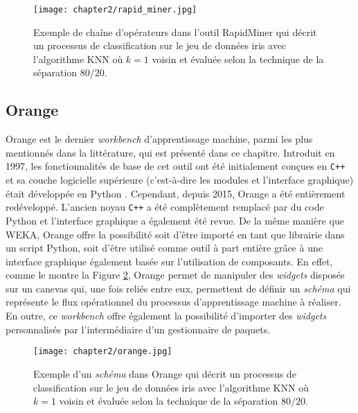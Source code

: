 \begin{figure}[H]
	\centering
	\texttt{[image: chapter2/rapid\_miner.jpg]}
        \caption{Exemple de chaîne d'opérateurs dans l'outil RapidMiner qui décrit un processus de classification sur le jeu de données iris avec l'algorithme \acs{KNN} où $k=1$ voisin et évaluée selon la technique de la séparation $80/20$.}
	\label{fig:rapid_miner}
\end{figure}

\subsection{Orange}

Orange est le dernier \textit{workbench} d'apprentissage machine, parmi les plus mentionnés dans la littérature, qui est présenté dans ce chapitre. Introduit en 1997, les fonctionnalités de base de cet outil ont été initialement conçues en \verb!C++! et sa couche logicielle supérieure (c'est-à-dire les modules et l'interface graphique) était développée en Python \citep{Demsar2004,Demsar2013}. Cependant, depuis 2015, Orange a été entièrement redéveloppé. L'ancien noyau \verb!C++! a été complètement remplacé par du code Python et l'interface graphique a également été revue. De la même manière que \acs{WEKA}, Orange offre la possibilité soit d'être importé en tant que librairie dans un script Python, soit d'être utilisé comme outil à part entière grâce à une interface graphique également basée sur l'utilisation de composants. En effet, comme le montre la Figure \ref{fig:orange}, Orange permet de manipuler des \emph{widgets} disposés sur un canevas qui, une fois reliés entre eux, permettent de définir un \emph{schéma} qui représente le flux opérationnel du processus d'apprentissage machine à réaliser. En outre, ce \textit{workbench} offre également la possibilité d'importer des \emph{widgets} personnalisés par l'intermédiaire d'un gestionnaire de paquets.

\begin{figure}[H]
	\centering
	\texttt{[image: chapter2/orange.jpg]}
        \caption{Exemple d'un \emph{schéma} dans Orange qui décrit un processus de classification sur le jeu de données iris avec l'algorithme \acs{KNN} où $k=1$ voisin et évaluée selon la technique de la séparation $80/20$.}
	\label{fig:orange}
\end{figure}

